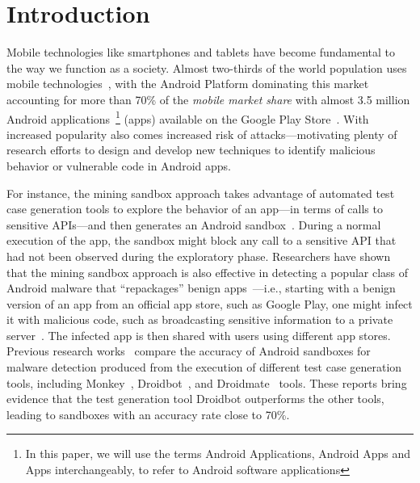 \section{Introduction}\label{sec:introduction}

Mobile technologies like smartphones and tablets have become fundamental to the way we function as a society. Almost two-thirds of the world population
uses mobile technologies~\cite{Comscore,DBLP:journals/tse/MartinSJZH17}, with the
Android Platform dominating this market accounting for more than 70\% of the \emph{mobile
market share} with almost 3.5 million Android applications~\footnote{In this paper, we will use the terms Android Applications, Android Apps and Apps interchangeably, to refer to Android software applications} (apps)
available on the Google Play Store~\cite{Statista}. 
With increased popularity also comes increased risk of attacks---motivating plenty of research efforts to design and develop new techniques
to identify malicious behavior or vulnerable code in Android apps.

For instance, the
mining sandbox approach takes advantage of automated test case generation tools 
to explore the behavior of an app---in terms of calls to sensitive APIs---and then
generates an Android sandbox~\cite{DBLP:conf/icse/JamrozikSZ16}. During a normal
execution of the app, the sandbox might block any call to a sensitive API
that had not been observed during the exploratory phase. 
Researchers have shown that the mining sandbox approach is also effective
in detecting a popular class of Android malware that ``repackages'' benign apps~\cite{DBLP:conf/wcre/BaoLL18,le2018towards}---i.e., starting with a benign version of an app from an official app store, such as Google Play, one might infect it with
malicious code, such as broadcasting
sensitive information to a private server~\cite{DBLP:journals/tse/LiBK21}. The infected app is then
shared with users using different app stores. 
Previous research works~\cite{DBLP:conf/wcre/BaoLL18,DBLP:journals/jss/CostaMMSSBNR22} compare the accuracy of Android sandboxes for malware detection 
produced from the execution of different test case generation tools, including Monkey~\cite{Monkey}, Droidbot~\cite{DBLP:conf/icse/LiYGC17}, and Droidmate~\cite{DBLP:conf/kbse/BorgesHZ18} tools.
These reports bring evidence that the test generation tool Droidbot outperforms the other tools, leading to sandboxes with an accuracy
rate close to 70\%. 

